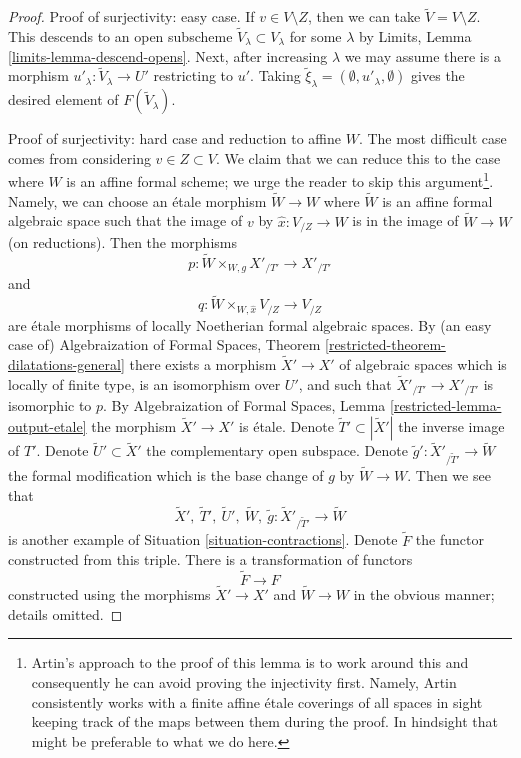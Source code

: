 \documentclass[10pt,a4paper]{amsart}
\theoremstyle{plain}
\theoremstyle{definition}
\theoremstyle{remark}
\numberwithin{equation}{subsection}
\begin{document}
\begin{proof}
\medskip\noindent
Proof of surjectivity: easy case.
If $v \in V \setminus Z$, then we can take $\tilde V = V \setminus Z$.
This descends to an open subscheme $\tilde V_\lambda \subset V_\lambda$
for some $\lambda$ by Limits, Lemma
\ref{limits-lemma-descend-opens}.
Next, after increasing $\lambda$ we may assume
there is a morphism $u'_\lambda : \tilde V_\lambda \to U'$
restricting to $u'$. Taking
$\tilde \xi_\lambda = (\emptyset, u'_\lambda, \emptyset)$
gives the desired element of $F(\tilde V_\lambda)$.

\medskip\noindent
Proof of surjectivity: hard case and reduction to affine $W$.
The most difficult case comes from considering $v \in Z \subset V$.
We claim that we can reduce this to the case where $W$ is an
affine formal scheme; we urge the reader to skip this argument\footnote{Artin's
approach to the proof of this lemma is to work around this and
consequently he can avoid proving the injectivity first. Namely, Artin
consistently works with a finite affine \'etale coverings of all spaces
in sight keeping track of the maps between them during the proof.
In hindsight that might be preferable to what we do here.}.
Namely, we can choose an \'etale morphism
$\tilde W \to W$ where $\tilde W$ is an affine formal algebraic space
such that the image of $v$ by $\hat x : V_{/Z} \to W$ is
in the image of $\tilde W \to W$ (on reductions).
Then the morphisms
$$
p : \tilde W \times_{W, g} X'_{/T'} \longrightarrow X'_{/T'}
$$
and
$$
q : \tilde W \times_{W, \hat x} V_{/Z} \to V_{/Z}
$$
are \'etale morphisms of locally Noetherian formal algebraic spaces.
By (an easy case of) Algebraization of Formal Spaces, Theorem
\ref{restricted-theorem-dilatations-general}
there exists a morphism $\tilde X' \to X'$ of algebraic spaces
which is locally of finite type, is an isomorphism over $U'$, and
such that $\tilde X'_{/T'} \to X'_{/T'}$ is isomorphic to $p$.
By Algebraization of Formal Spaces, Lemma \ref{restricted-lemma-output-etale}
the morphism $\tilde X' \to X'$ is \'etale. Denote
$\tilde T' \subset |\tilde X'|$ the inverse image of $T'$.
Denote $\tilde U' \subset \tilde X'$ the complementary open subspace.
Denote $\tilde g' : \tilde X'_{/\tilde T'} \to \tilde W$
the formal modification which is the base change of $g$ by
$\tilde W \to W$. Then we see that
$$
\tilde X',\ \tilde T',\ \tilde U',\ \tilde W,
\ \tilde g : \tilde X'_{/\tilde T'} \to \tilde W
$$
is another example of Situation \ref{situation-contractions}.
Denote $\tilde F$ the functor constructed from this triple.
There is a transformation of functors
$$
\tilde F \longrightarrow F
$$
constructed using the morphisms $\tilde X' \to X'$ and
$\tilde W \to W$ in the obvious manner; details omitted.


\end{proof}
\end{document}
